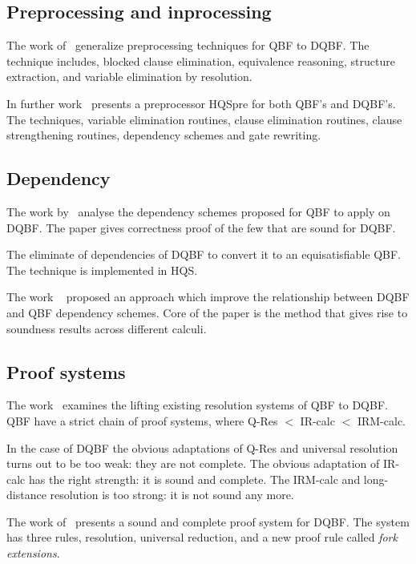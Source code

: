 \documentclass[runningheads]{llncs}
\begin{document}
\subsection{Preprocessing and inprocessing}
The work of~\cite{wimmer2015preprocessing} generalize preprocessing techniques for QBF to DQBF.
%
The technique includes, blocked clause elimination, equivalence reasoning, structure extraction, and variable elimination by resolution.

In further work~\cite{wimmer2017hqspre} presents a preprocessor HQSpre for both QBF's and DQBF's.
%
The techniques, variable elimination routines, clause elimination routines, clause strengthening routines, dependency schemes and gate rewriting.

\subsection{Dependency}
The work by~\cite{wimmer2016dependency} analyse the dependency
schemes proposed for QBF to apply on DQBF.
%
The paper gives correctness proof of the few that are sound for DQBF.
%

The \cite{wimmer2017dqbf} eliminate of dependencies of DQBF to convert it to an equisatisfiable QBF.
%
The technique is implemented in HQS.



The work ~\cite{beyersdorff2018reinterpreting} proposed an approach which improve the relationship between DQBF and QBF
dependency schemes.
%
Core of the paper is the method that gives rise to soundness results across different calculi.

\subsection{Proof systems}
The work~\cite{beyersdorff2016lifting} examines the lifting existing resolution systems of QBF to DQBF.
%
QBF have a strict chain of proof systems, where Q-Res $<$ IR-calc $<$ IRM-calc.
%

In the case of DQBF the obvious adaptations of Q-Res and universal resolution turns out to be too weak: they are not complete.
%
The obvious adaptation of IR-calc has
the right strength: it is sound and complete.
%
The IRM-calc and long-distance resolution is too strong: it is not sound any more.

The work of~\cite{rabe2017resolution} presents a sound and complete proof system for DQBF.
%
The system has three rules, resolution, universal reduction, and a new proof rule called \textit{fork extensions}.
\end{document}
